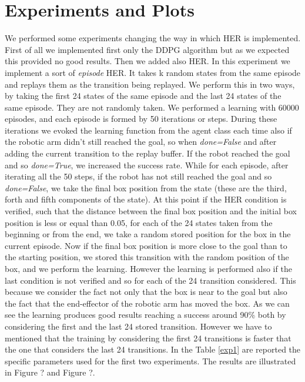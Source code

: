 \documentclass[a4paper]{report}
\begin{document}
\section{Experiments and Plots}
We performed some experiments changing the way in which HER is implemented.
First of all we implemented first only the DDPG algorithm but as we expected this provided no good results. Then we added also HER. In this experiment we implement a  sort of \textit{episode} HER. It takes k random states from the same episode and replays them as the transition being replayed. We perform this in two ways, by taking the first 24 states of the same episode and the last 24 states of the same episode. They are not randomly taken. We performed a learning with 60000 episodes, and each episode is formed by 50 iterations or steps. During these iterations we evoked the learning function from the agent class each time also if the robotic arm didn't still reached the goal, so when \textit{done=False} and after adding the current transition to the replay buffer. If the robot reached the goal and so \textit{done=True}, we increased the success rate. While for each episode, after iterating all the 50 steps, if the robot has not still reached the goal and so \textit{done=False}, we take the final box position from the state (these are the third, forth and fifth components of the state). At this point if the HER condition is verified, such that the distance between the final box position and the initial box position is less or equal than 0.05, for each of the 24 states taken from the beginning or from the end, we take a random stored position for the box in the current episode. Now if the final box position is more close to the goal than to the starting position, we stored this transition with the random position of the box, and we perform the learning. However the learning is performed also if the last condition is not verified and so for each of the 24 transition considered. This because we consider the fact not only that the box is near to the goal but also the fact that the end-effector of the robotic arm has moved the box. As we can see the learning produces good results reaching a success around 90\% both by considering the first and the last 24 stored transition. However we have to mentioned that the training by considering the first 24 transitions is faster that the one that considers the last 24 transitions. In the Table \ref{exp1} are reported the specific parameters used for the first two experiments. The results are illustrated in Figure ? and Figure ?.
\end{document}
